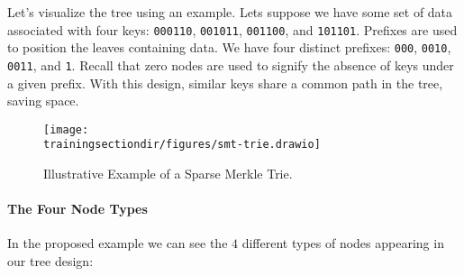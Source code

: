 Let's visualize the tree using an example. Lets suppose we have some set of data associated with four keys: \texttt{000110}, \texttt{001011}, \texttt{001100}, and \texttt{101101}. Prefixes are used to position the leaves containing data. We have four distinct prefixes: \texttt{000}, \texttt{0010}, \texttt{0011}, and \texttt{1}. Recall that zero nodes are used to signify the absence of keys under a given prefix. With this design, similar keys share a common path in the tree, saving space.

\begin{figure}[H]
\centering
\texttt{[image: \\trainingsectiondir/figures/smt-trie.drawio]}
\caption{Illustrative Example of a Sparse Merkle Trie.}
\end{figure}

\paragraph*{The Four Node Types} In the proposed example we can see the $4$ different types of nodes appearing in our tree design:


